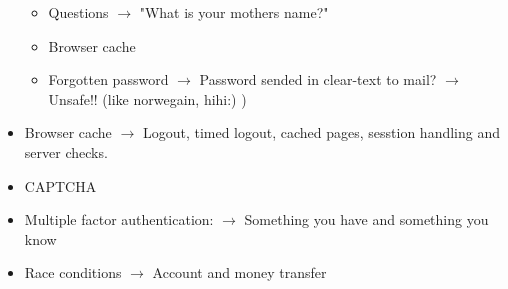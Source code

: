 \begin{itemize}
			\begin{itemize}
				\item Questions $\rightarrow$ "What is your mothers name?"
				\item Browser cache
				\item Forgotten password $\rightarrow$ Password sended in clear-text to mail? $\rightarrow$ Unsafe!! (like norwegain, hihi:) )
			\end{itemize}
		\item Browser cache $\rightarrow$ Logout, timed logout, cached pages, sesstion handling and server checks. 
		\item CAPTCHA
		\item Multiple factor authentication: $\rightarrow$ Something you have and something you know
		\item Race conditions $\rightarrow$ Account and money transfer
	\end{itemize}

